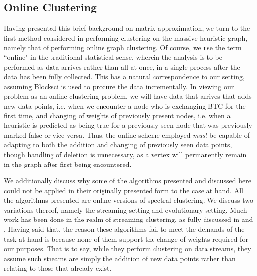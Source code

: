 \documentclass[journal]{IEEEtran}
\begin{document}
\subsection{Online Clustering}
Having presented this brief background on matrix approximation, we turn to the first method considered in performing clustering on the massive heuristic graph, namely that of performing online graph clustering. Of course, we use the term ``online" in the traditional statistical sense, wherein the analysis is to be performed as data arrives rather than all at once, in a single process after the data has been fully collected. This has a natural correspondence to our setting, assuming Blocksci is used to procure the data incrementally. In viewing our problem as an online clustering problem, we will have data that arrives that adds new data points, i.e. when we encounter a node who is exchanging BTC for the first time, and changing of weights of previously present nodes, i.e. when a heuristic is predicted as being true for a previously seen node that was previously marked false or vice versa. Thus, the online scheme employed \textit{must} be capable of adapting to both the addition and changing of previously seen data points, though handling of deletion is unnecessary, as a vertex will permanently remain in the graph after first being encountered.

We additionally discuss why some of the algorithms presented and discussed here could not be applied in their originally presented form to the case at hand. All the algorithms presented are online versions of spectral clustering. We discuss two variations thereof, namely the streaming setting and evolutionary setting. Much work has been done in the realm of streaming clustering, as fully discussed in \cite{streaming} and \cite{eigen-update}. Having said that, the reason these algorithms fail to meet the demands of the task at hand is because none of them support the change of weights required for our purposes. That is to say, while they perform clustering on data streams, they assume such streams are simply the addition of new data points rather than relating to those that already exist.
\end{document}
